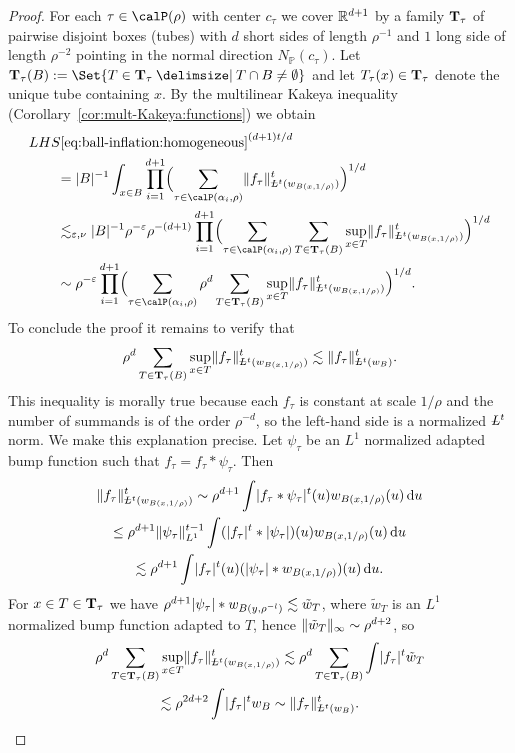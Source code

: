 \begin{proof}
For each $\tau \in \Part{\rho}$ with center $c_{\tau}$ we cover $\mathbb{R}^{d+1}$ by a family $\mathbf{T}_\tau$ of pairwise disjoint boxes (tubes) with $d$ short sides of length $\rho^{-1}$ and $1$ long side of length $\rho^{-2}$ pointing in the normal direction $N_{\mathbb{P}}(c_{\tau})$.
Let $\Tubes_{\tau}(B) := \Set{ T \in \Tubes_{\tau} \given T\cap B \neq \emptyset}$ and let $T_\tau(x) \in \mathbf{T}_{\tau}$ denote the unique tube containing $x$.
By the multilinear Kakeya inequality (Corollary~\ref{cor:mult-Kakeya:functions}) we obtain
\begin{align*}
\MoveEqLeft
LHS\eqref{eq:ball-inflation:homogeneous}^{(d+1)t/d}\\
&=
\abs{B}^{-1} \int_{x\in B} \prod_{i=1}^{d+1} \Bigl( \sum_{\tau \in \Part[\alpha_{i}]{\rho}} \norm{f_{\tau}}_{\avL^{t}(w_{B(x,1/\rho)})}^{t} \Bigr)^{1/d}\\
&\lesssim_{\epsilon,\nu} \abs{B}^{-1} \rho^{-\epsilon} \rho^{-(d+1)}
\prod_{i=1}^{d+1} \Bigl( \sum_{\tau \in \Part[\alpha_{i}]{\rho}} \sum_{T\in \Tubes_{\tau}(B)} \sup_{x \in T} \norm{f_{\tau}}_{\avL^{t}(w_{B(x,1/\rho)})}^{t} \Bigr)^{1/d}\\
&\sim \rho^{-\epsilon}
\prod_{i=1}^{d+1} \Bigl( \sum_{\tau \in \Part[\alpha_{i}]{\rho}} \rho^{d} \sum_{T\in \Tubes_{\tau}(B)} \sup_{x \in T} \norm{f_{\tau}}_{\avL^{t}(w_{B(x,1/\rho)})}^{t} \Bigr)^{1/d}.
\end{align*}
To conclude the proof it remains to verify that
\[
\rho^{d} \sum_{T\in \Tubes_{\tau}(B)} \sup_{x \in T} \norm{f_{\tau}}_{\avL^{t}(w_{B(x,1/\rho)})}^{t}
\lesssim
\norm{f_{\tau}}_{\avL^{t}(w_{B})}^{t}.
\]
This inequality is morally true because each $f_{\tau}$ is constant at scale $1/\rho$ and the number of summands is of the order $\rho^{-d}$, so the left-hand side is a normalized $\avL^{t}$ norm.
We make this explanation precise.
Let $\psi_{\tau}$ be an $L^{1}$ normalized adapted bump function such that $f_{\tau} = f_{\tau} * \psi_{\tau}$.
Then
\begin{multline*}
\norm{ f_\tau  }_{\avL^t(w_{B(x, 1/\rho)})}^t
\sim
\rho^{d+1} \int \abs{f_\tau * \psi_{\tau}}^t(u) w_{B(x, 1/\rho)}(u) \dif u\\
\leq
\rho^{d+1} \norm{\psi_{\tau}}_{L^{1}}^{t-1}
\int (\abs{f_\tau}^{t} * \abs{\psi_{\tau}})(u) w_{B(x, 1/\rho)}(u) \dif u\\
\lesssim
\rho^{d+1} \int \abs{f_\tau}^{t}(u) (\abs{\psi_{\tau}}*w_{B(x, 1/\rho)})(u) \dif u.
\end{multline*}
For $x\in T \in \mathbf{T}_{\tau}$ we have $\rho^{d+1} \lvert\psi_{\tau}\rvert*w_{B(y, \rho^{-l})} \lesssim \tilde{w}_{T}$, where $\tilde{w}_{T}$ is an $L^{1}$ normalized bump function adapted to $T$, hence $\lVert\tilde{w}_{T}\rVert_{\infty} \sim \rho^{d+2}$, so
\begin{multline*}
\rho^{d} \sum_{T\in \Tubes_{\tau}(B)} \sup_{x \in T} \norm{f_{\tau}}_{\avL^{t}(w_{B(x,1/\rho)})}^{t}
\lesssim
\rho^{d} \sum_{T\in \Tubes_{\tau}(B)} \int \abs{f_{\tau}}^{t} \tilde{w}_{T}\\
\lesssim
\rho^{2d+2} \int \abs{f_{\tau}}^{t} w_{B}
\sim
\norm{f_{\tau}}_{\avL^{t}(w_{B})}^{t}.
\qedhere
\end{multline*}
\end{proof}


